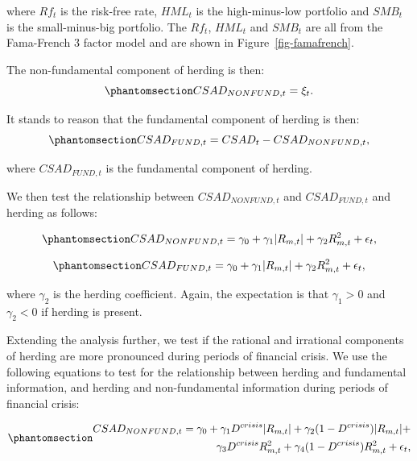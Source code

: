 \documentclass[
  letterpaper,
  DIV=11,
  numbers=noendperiod]{scrartcl}
\begin{document}
where \(Rf_t\) is the risk-free rate, \(HML_t\) is the high-minus-low
portfolio and \(SMB_t\) is the small-minus-big portfolio. The \(Rf_t\),
\(HML_t\) and \(SMB_t\) are all from the Fama-French 3 factor model
\citep[see][]{fama1993common} and are shown in
Figure~\ref{fig-famafrench}.

The non-fundamental component of herding is then:
\begin{equation}\phantomsection\label{eq-nonfunda}{CSAD_{NONFUND, t} = \xi_t. }\end{equation}

It stands to reason that the fundamental component of herding is then:
\begin{equation}\phantomsection\label{eq-funda}{CSAD_{FUND, t} = CSAD_t - CSAD_{NONFUND, t},}\end{equation}

where \(CSAD_{FUND, t}\) is the fundamental component of herding.

We then test the relationship between \(CSAD_{NONFUND, t}\) and
\(CSAD_{FUND, t}\) and herding as follows:

\begin{equation}\phantomsection\label{eq-nonfundaherd}{CSAD_{NONFUND,t} = \gamma_0 +  \gamma_1|R_{m, t}| +  \gamma_2R_{m, t}^2 + \epsilon_{t},}\end{equation}

\begin{equation}\phantomsection\label{eq-fundaherd}{CSAD_{FUND,t} = \gamma_0 +  \gamma_1|R_{m, t}| +  \gamma_2R_{m, t}^2 + \epsilon_{t},}\end{equation}

where \(\gamma_2\) is the herding coefficient. Again, the expectation is
that \(\gamma_1 > 0\) and \(\gamma_2 < 0\) if herding is present.

Extending the analysis further, we test if the rational and irrational
components of herding are more pronounced during periods of financial
crisis. We use the following equations to test for the relationship
between herding and fundamental information, and herding and
non-fundamental information during periods of financial crisis:

\begin{equation}\phantomsection\label{eq-nonfundacrisis}{
\begin{aligned}
CSAD_{NONFUND, t} = \gamma_0 +  \gamma_1D^{crisis}|R_{m, t}| + \gamma_2(1 - D^{crisis})|R_{m,t}|  + \\  
\gamma_3D^{crisis}R_{m, t}^2 + \gamma_4(1-D^{crisis})R_{m,t}^2 + \epsilon_{t},
\end{aligned}
}\end{equation}
\end{document}
